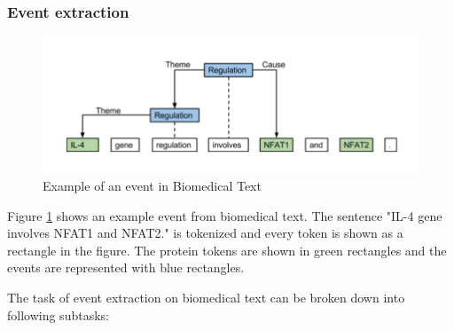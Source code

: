 \subsubsection{Event extraction}

\begin{figure}
\centering
\includegraphics[scale=0.4]{figures/EventExample.png}
\caption{Example of an event in Biomedical Text}\label{fig:eventExample}
\end{figure}

Figure \ref{fig:eventExample} shows an example event from biomedical text. The sentence "IL-4 gene involves NFAT1 and NFAT2." is tokenized and every token is shown as a rectangle in the figure. The protein tokens are shown in green rectangles and the events are represented with blue rectangles.

The task of event extraction on biomedical text can be broken down into following subtasks:

